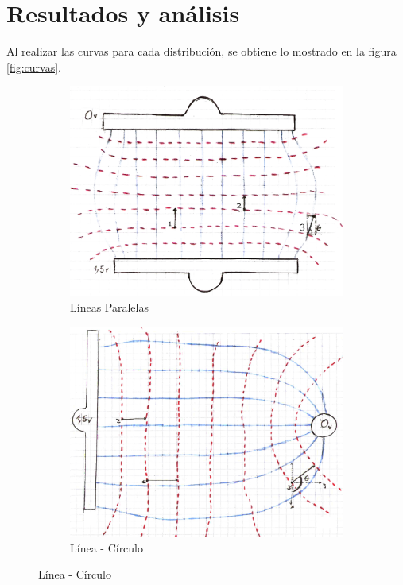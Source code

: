 \documentclass[10pt,twocolumn]{article}
\begin{document}
\section{Resultados y análisis}
Al realizar las curvas para cada distribución, se obtiene lo mostrado en la figura \ref{fig:curvas}.
\begin{figure}[H]
  \centering
  \begin{subfigure}[b]{0.80\linewidth}
    \includegraphics[width=\linewidth]{placas.png}
    \caption{Líneas Paralelas}
  \end{subfigure}
  
  \vspace{8mm}
    \begin{subfigure}[b]{0.80\linewidth}
    \includegraphics[width=\textwidth]{placa-esfera.png}
    \caption{Línea - Círculo}
  \end{subfigure}
  

\end{figure}
\end{document}
